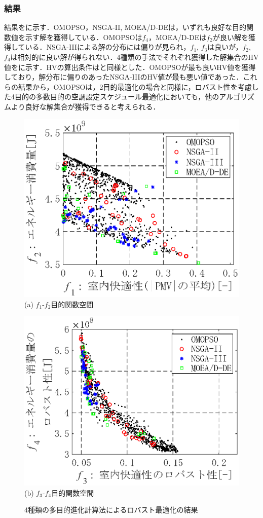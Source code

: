 \subsubsection{結果}
結果をに示す．OMOPSO，NSGA-II, MOEA/D-DEは，いずれも良好な目的関数値を示す解を獲得している．OMOPSOは$f_4$，MOEA/D-DEは$f_2$が良い解を獲得している．NSGA-IIIによる解の分布には偏りが見られ，$f_1$, $f_3$は良いが，$f_2$, $f_4$は相対的に良い解が得られない．4種類の手法でそれぞれ獲得した解集合のHV値をに示す．HVの算出条件はと同様とした．OMOPSOが最も良いHV値を獲得しており，解分布に偏りのあったNSGA-IIIのHV値が最も悪い値であった．これらの結果から，OMOPSOは，2目的最適化の場合と同様に，ロバスト性を考慮した4目的の多数目的の空調設定スケジュール最適化においても，他のアルゴリズムより良好な解集合が獲得できると考えられる．

\begin{figure}[htb]
    \begin{center}
        \includegraphics[width=0.7\columnwidth,keepaspectratio=true]{fig/robust_result_algo_pareto_f1f2.eps}\\
        {(a) $f_1$-$f_2$目的関数空間}
    \end{center}
    \begin{center}
        \includegraphics[width=0.7\columnwidth,keepaspectratio=true]{fig/robust_result_algo_pareto_f3f4.eps}\\
        {(b) $f_3$-$f_4$目的関数空間}
    \end{center}
    \caption{4種類の多目的進化計算法によるロバスト最適化の結果}
    \label{fig::robust_result_pareto_algo}
\end{figure}

